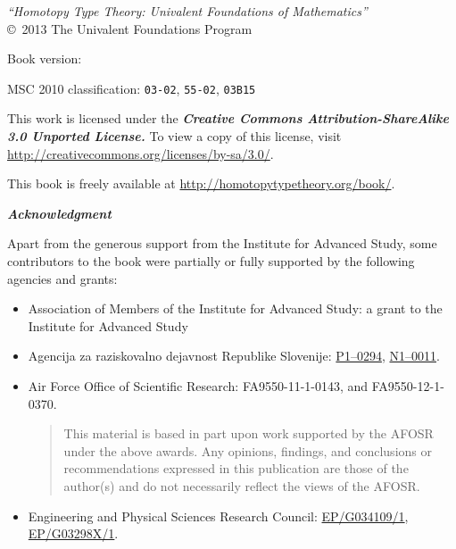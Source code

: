 \hbox{}
\vfill

{\small
\noindent
\emph{``Homotopy Type Theory: Univalent Foundations of Mathematics''}\\
\copyright\ 2013 The Univalent Foundations Program

\medskip
\noindent
Book version: \texttt{\OPTversion}

\medskip
\noindent
MSC 2010 classification:
\texttt{03-02},
\texttt{55-02},
\texttt{03B15}

\bigskip
\footnotesize

\noindent
This work is licensed under the
\textbf{\emph{Creative Commons Attribution-ShareAlike 3.0 Unported License.}}
%
To view a copy of this license, visit
\url{http://creativecommons.org/licenses/by-sa/3.0/}.

\bigskip

\noindent
This book is freely available at \url{http://homotopytypetheory.org/book/}.

\bigskip

\noindent
\emph{\textbf{\small Acknowledgment}}

\medskip

\noindent
Apart from the generous support from the Institute for Advanced Study, some contributors
to the book were partially or fully supported by the following agencies and grants:
%
\begin{itemize}
\item Association of Members of the Institute for Advanced Study: a grant to the Institute for Advanced Study %
\item Agencija za raziskovalno dejavnost Republike Slovenije:  %
\href{http://www.sicris.si/search/prg.aspx?id=6120}{P1--0294},
\href{http://www.sicris.si/search/prj.aspx?id=7109}{N1--0011}.

\item Air Force Office of Scientific Research:
  FA9550-11-1-0143, and %
  FA9550-12-1-0370.  %
  {
    \setlength{\parskip}{0pt}
    \begin{quote}
      \noindent\scriptsize
      This material is based in part upon work supported by the AFOSR under the above awards.
      Any opinions, findings, and conclusions or recommendations expressed in this publication are those of the author(s) and do not necessarily reflect the views of the AFOSR.
    \end{quote}
  }

\item Engineering and Physical Sciences Research Council: %
   \href{http://gow.epsrc.ac.uk/NGBOViewGrant.aspx?GrantRef=EP/G034109/1}{EP/G034109/1}, %
   \href{http://gow.epsrc.ac.uk/NGBOViewGrant.aspx?GrantRef=EP/G03298X/1}{EP/G03298X/1}. %


\end{itemize}}
